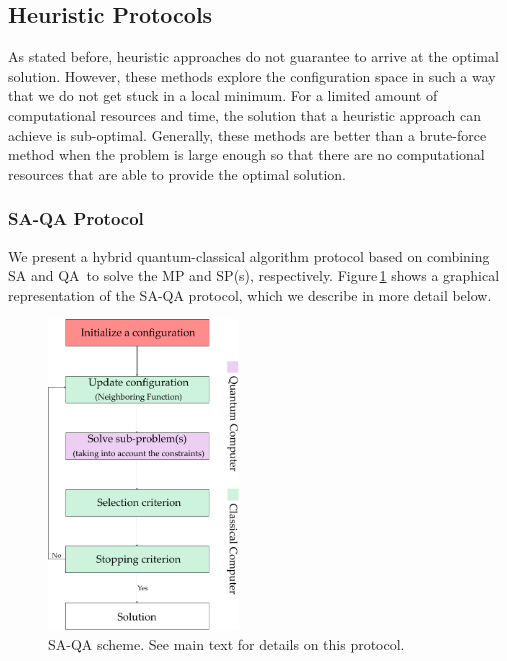 \subsection{Heuristic Protocols}
As stated before, heuristic approaches do not guarantee to arrive at the optimal solution. However, these methods explore the configuration space in such a way that we do not get stuck in a local minimum. For a limited amount of computational resources and time, the solution that a heuristic approach can achieve is sub-optimal. Generally, these methods are better than a brute-force method when the problem is large enough so that there are no computational resources that are able to provide the optimal solution.
\subsubsection{SA-QA Protocol}
We present a hybrid quantum-classical algorithm protocol based on combining SA and QA\,\cite{Ding2019ImplementationDesign} to solve the MP and SP(s), respectively. Figure\,\ref{fig:SA_QAProtocol} shows a graphical representation of the SA-QA protocol, which we describe in more detail below. 
\begin{figure}[H]
\centering
\includegraphics[width=0.45\textwidth]{Figures/SAQAProtocol.pdf} 
\caption{SA-QA scheme. See main text for details on this protocol.}
\label{fig:SA_QAProtocol}
\end{figure}
